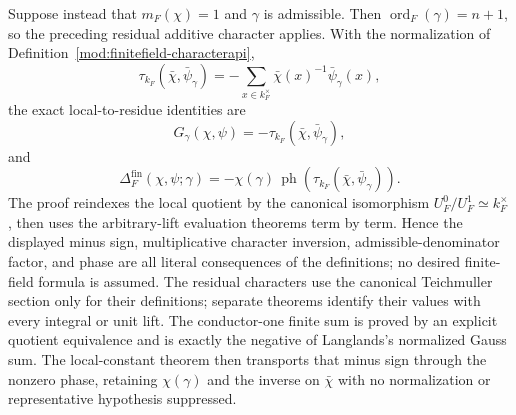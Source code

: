 \begin{theorem}
Suppose instead that $m_F(\chi)=1$ and $\gamma$ is admissible.  Then
$\operatorname{ord}_F(\gamma)=n+1$, so the preceding residual additive
character applies.  With the normalization of
Definition~\ref{mod:finitefield-characterapi},
\[
 \tau_{k_F}(\bar\chi,\bar\psi_\gamma)
 =-\sum_{x\in k_F^\times}
     \bar\chi(x)^{-1}\bar\psi_\gamma(x),
\]
the exact local-to-residue identities are
\[
 G_\gamma(\chi,\psi)
   =-\tau_{k_F}(\bar\chi,\bar\psi_\gamma),
\]
and
\[
 \Delta_F^{\mathrm{fin}}(\chi,\psi;\gamma)
 =-\chi(\gamma)\,
   \operatorname{ph}\!\left(
     \tau_{k_F}(\bar\chi,\bar\psi_\gamma)\right).
\]
The proof reindexes the local quotient by the canonical isomorphism
$U_F^0/U_F^1\simeq k_F^\times$, then uses the arbitrary-lift evaluation
theorems term by term.  Hence the displayed minus sign, multiplicative
character inversion, admissible-denominator factor, and phase are all
literal consequences of the definitions; no desired finite-field formula
is assumed.
\leanok
{}
\FormalizationContract The residual characters use the canonical Teichmuller
section only for their definitions; separate theorems identify their values
with every integral or unit lift.  The conductor-one finite sum is proved by
an explicit quotient equivalence and is exactly the negative of Langlands's
normalized Gauss sum.  The local-constant theorem then transports that minus
sign through the nonzero phase, retaining $\chi(\gamma)$ and the inverse on
$\bar\chi$ with no normalization or representative hypothesis suppressed.
\end{theorem}
